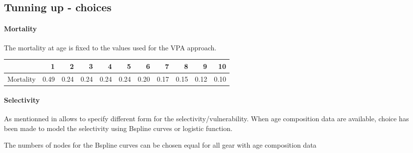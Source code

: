 
\subsection{Tunning up \iscam - choices}


\paragraph{Mortality}
The mortality at age is fixed to the values used for the VPA approach.

\begin{table}[ht]
\centering
\begin{tabular}{rrrrrrrrrrr}
  \hline
 & 1 & 2 & 3 & 4 & 5 & 6 & 7 & 8 & 9 & 10 \\ 
  \hline
Mortality & 0.49 & 0.24 & 0.24 & 0.24 & 0.24 & 0.20 & 0.17 & 0.15 & 0.12 & 0.10 \\ 
   \hline
\end{tabular}
\end{table}


\paragraph{Selectivity}
As mentionned in \iscam allows to specify different form for the
selectivity/vulnerability.  When  age composition data  are available,
choice has been made to model  the selectivity using Bspline curves or
logistic function.






The numbers  of nodes for the  Bspline curves can be  chosen equal for
all gear with age composition data 


